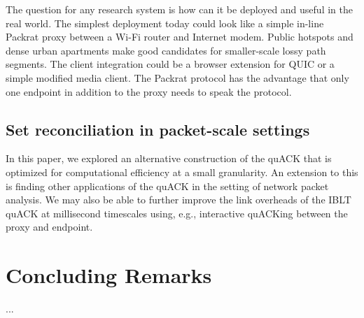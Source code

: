 The question for any research system is how can it be deployed and useful in
the real world. The simplest deployment today could look like a simple in-line
Packrat proxy between a Wi-Fi router and Internet modem. Public hotspots and
dense urban apartments make good candidates for smaller-scale lossy path
segments.
The client integration could be a browser extension for QUIC or a simple
modified media client.
The Packrat protocol has the advantage that only one endpoint in addition to the
proxy needs to speak the protocol.

\subsection{Set reconciliation in packet-scale settings}

In this paper, we explored an alternative construction of the quACK that is
optimized for computational efficiency at a small granularity. An extension to
this is finding other applications of the quACK in the setting of network
packet analysis. We may also be able to further improve the link overheads of
the IBLT quACK at millisecond timescales using, e.g., interactive quACKing
between the proxy and endpoint.



\section{Concluding Remarks}
...